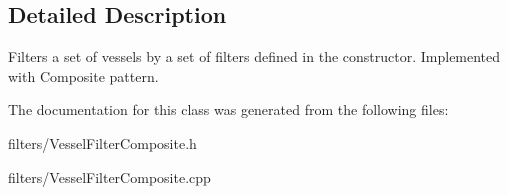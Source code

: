 \subsection{Detailed Description}
Filters a set of vessels by a set of filters defined in the constructor. Implemented with Composite pattern. 

The documentation for this class was generated from the following files\+:\begin{DoxyCompactItemize}
\item 
filters/Vessel\+Filter\+Composite.\+h\item 
filters/Vessel\+Filter\+Composite.\+cpp\end{DoxyCompactItemize}
